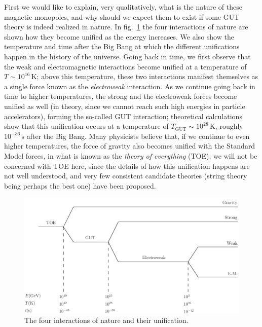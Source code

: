 \documentclass[11pt, a4paper,oneside,openright]{book}
\numberwithin{equation}{section}
\begin{document}
First we would like to explain, very qualitatively, what is the nature of these magnetic monopoles, and why should we expect them to exist if some GUT theory is indeed realized in nature. In fig.\ \ref{fig:lec12_5} the four interactions of nature are shown how they become unified as the energy increases. We also show the temperature and time after the Big Bang at which the different unifications happen in the history of the universe. Going back in time, we first observe that the weak and electromagnetic interactions become unified at a temperature of $T\sim 10^{16}\,{\mathrm{K}}$; above this temperature, these two interactions manifest themselves as a single force known as the {\it electroweak} interaction. As we continue going back in time to higher temperatures, the strong and the electroweak forces become unified as well (in theory, since we cannot reach such high energies in particle accelerators), forming the so-called GUT interaction; theoretical calculations show that this unification occurs at a 
temperature of $T_{\mathrm{GUT}}\sim 10^{28}\,\mathrm{K}$, roughly $10^{-36}\,\mathrm{s}$ after the Big Bang. Many physicists believe that, if we continue to even higher temperatures, the force of gravity also becomes unified with the Standard Model forces, in what is known as the {\it theory of everything} (TOE); we will not be concerned with TOE here, since the details of how this unification happens are not well understood, and very few consistent candidate theories (string theory being perhaps the best one) have been proposed.
\begin{figure}[ht]
\begin{center}
\includegraphics[scale=0.55]{Draw/lec12_5.png}
\end{center}
\caption{The four interactions of nature and their unification.}
\label{fig:lec12_5}
\end{figure}
\end{document}
